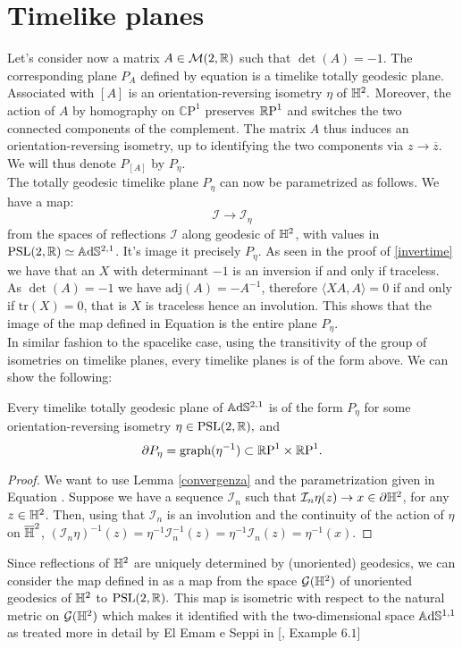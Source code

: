 \section{Timelike planes}
Let's consider now a matrix $A\in\mathcal{M}(2,\R)$ such that $\det(A)=-1.$ The corresponding plane $P_A$ defined by equation  is a timelike totally geodesic plane. Associated with $[A]$ is an orientation-reversing isometry $\eta$ of $\H^2.$ Moreover, the action of $A$ by homography on $\mathbb{C}\text{P}^1$ preserves $\S$ and switches the two connected components of the complement. The matrix $A$ thus induces an orientation-reversing isometry, up to identifying the two components via $z\to\overline{z}$. We will thus denote $P_{[A]}$ by $P_\eta$. \\
The totally geodesic timelike plane $P_\eta$ can now be parametrized as follows. We have a map: 
\begin{equation}\label{refspa}
    \mathcal{I}\to\mathcal{I}_\eta
\end{equation}
from the spaces of reflections $\mathcal{I}$ along geodesic of $\H^2$, with values in $\PSL\simeq\A^{2,1}$. It's image it precisely $P_\eta.$ As seen in the proof of \ref{invertime} we have that an $X$ with determinant $-1$ is an inversion if and only if traceless. As $\det(A)=-1$ we have $\text{adj}(A)=-A^{-1}$, therefore $\langle XA,A\rangle=0$ if and only if $\text{tr}(X)=0$, that is $X$ is traceless hence an involution. This shows that the image of the map defined in Equation  is the entire plane $P_\eta$.\\  
In similar fashion to the spacelike case, using the transitivity of the group of isometries on timelike planes, every timelike planes is of the form above. We can show the following: 
\begin{lemma}
    Every timelike totally geodesic plane of $\A^{2,1}$ is of the form $P_\eta$ for some orientation-reversing isometry $\eta\in\PSL,$ and 
    \[
        \partial P_\eta=\text{graph}(\eta^{-1})\subset\T.
    \]
\end{lemma}
\begin{proof}
    We want to use Lemma \ref{convergenza} and the parametrization given in Equation . Suppose we have a sequence $\mathcal{I}_n$ such that $\mathcal{I}_n\eta(z)\to x\in\partial\H^2$, for any $z\in\H^2$. Then, using that $\mathcal{I}_n$ is an involution and the continuity of the action of $\eta$ on $\overline{\H}^2$, $(\mathcal{I}_n\eta)^{-1}(z)=\eta^{-1}\mathcal{I}_n^{-1}(z)=\eta^{-1}\mathcal{I}_n(z)=\eta^{-1}(x).$ 
\end{proof}
\begin{observation}
    Since reflections of $\H^2$ are uniquely determined by (unoriented) geodesics, we can consider the map defined in  as a map from the space $\mathcal{G}(\H^2)$ of unoriented geodesics of $\H^2$ to $\PSL.$ This map is isometric with respect to the natural metric on $\mathcal{G}(\H^2)$ which makes it identified with the two-dimensional space $\A^{1,1}$ as treated more in detail by El Emam e Seppi in [\cite{emam2022gauss}, Example $6.1$] 
    \end{observation}
